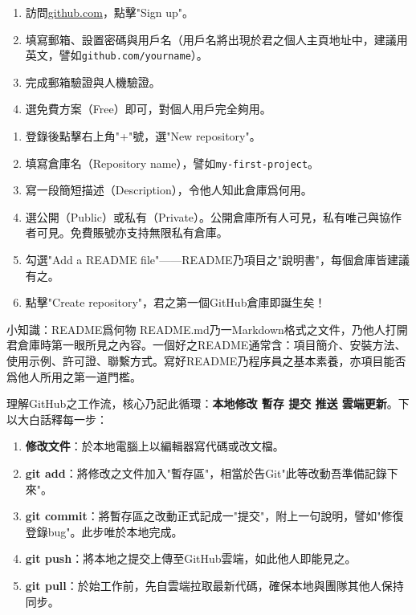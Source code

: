 

\begin{enumerate}
  \item 訪問\href{https://github.com}{github.com}，點擊"Sign up"。
  \item 填寫郵箱、設置密碼與用戶名（用戶名將出現於君之個人主頁地址中，建議用英文，譬如\texttt{github.\allowbreak com/\allowbreak yourname}）。
  \item 完成郵箱驗證與人機驗證。
  \item 選免費方案（Free）即可，對個人用戶完全夠用。
\end{enumerate}


\begin{enumerate}
  \item 登錄後點擊右上角"+"號，選"New repository"。
  \item 填寫倉庫名（Repository name），譬如\texttt{my-\allowbreak first-\allowbreak project}。
  \item 寫一段簡短描述（Description），令他人知此倉庫爲何用。
  \item 選公開（Public）或私有（Private）。公開倉庫所有人可見，私有唯己與協作者可見。免費賬號亦支持無限私有倉庫。
  \item 勾選"Add a README file"——README乃項目之"說明書"，每個倉庫皆建議有之。
  \item 點擊"Create repository"，君之第一個GitHub倉庫即誕生矣！
\end{enumerate}

\begin{tcbinfo}{小知識：README爲何物}
README.md乃一Markdown格式之文件，乃他人打開君倉庫時第一眼所見之內容。一個好之README通常含：項目簡介、安裝方法、使用示例、許可證、聯繫方式。寫好README乃程序員之基本素養，亦項目能否爲他人所用之第一道門檻。

\end{tcbinfo}


理解GitHub之工作流，核心乃記此循環：\textbf{本地修改 暫存 提交 推送 雲端更新}。下以大白話釋每一步：

\begin{enumerate}
  \item \textbf{修改文件}：於本地電腦上以編輯器寫代碼或改文檔。
  \item \textbf{git add}：將修改之文件加入"暫存區"，相當於告Git"此等改動吾準備記錄下來"。
  \item \textbf{git commit}：將暫存區之改動正式記成一"提交"，附上一句說明，譬如"修復登錄bug"。此步唯於本地完成。
  \item \textbf{git push}：將本地之提交上傳至GitHub雲端，如此他人即能見之。
  \item \textbf{git pull}：於始工作前，先自雲端拉取最新代碼，確保本地與團隊其他人保持同步。
\end{enumerate}


